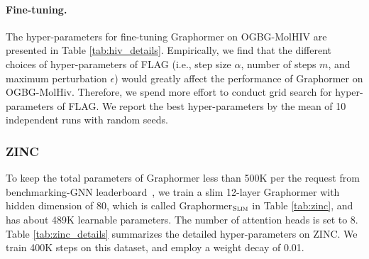 \documentclass{article}
\begin{document}
\paragraph{Fine-tuning.} The hyper-parameters for fine-tuning Graphormer on OGBG-MolHIV are presented in Table \ref{tab:hiv_details}. Empirically, we find that the different choices of hyper-parameters of FLAG (i.e., step size $\alpha$, number of steps $m$, and maximum perturbation $\epsilon$) would greatly affect the performance of Graphormer on OGBG-MolHiv. Therefore, we spend more effort to conduct grid search for hyper-parameters of FLAG. We report the best hyper-parameters by the mean of 10 independent runs with random seeds.


\subsubsection{ZINC}

To keep the total parameters of Graphormer less than 500K per the request from benchmarking-GNN leaderboard~\cite{dwivedi2020benchmarking}, we train a slim 12-layer Graphormer with hidden dimension of 80, which is called Graphormer$_{\small \textsc{Slim}}$\xspace in Table \ref{tab:zinc}, and has about 489K learnable parameters. The number of attention heads is set to 8. Table \ref{tab:zinc_details} summarizes the detailed hyper-parameters on ZINC. We train 400K steps on this dataset, and employ a weight decay of 0.01.
\end{document}
